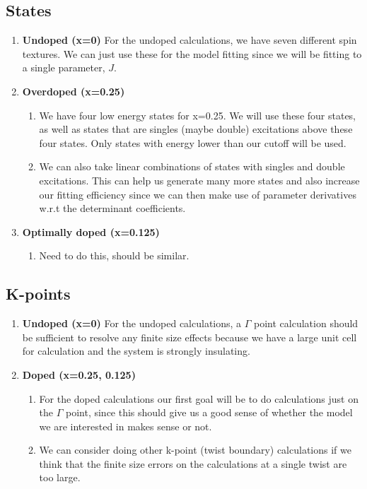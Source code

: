 \documentclass{article}
\begin{document}
\subsection{States}
\begin{enumerate}
\item \textbf{Undoped (x=0)} For the undoped calculations, we have seven different spin textures. We can just use these for the model fitting since we will be fitting to a single parameter, $J$.

\item \textbf{Overdoped (x=0.25)}
\begin{enumerate}
\item We have four low energy states for x=0.25. We will use these four states, as well as states that are singles (maybe double) excitations above these four states. Only states with energy lower than our cutoff will be used.
\item We can also take linear combinations of states with singles and double excitations. This can help us generate many more states and also increase our fitting efficiency since we can then make use of parameter derivatives w.r.t the determinant coefficients.
\end{enumerate}

\color{red}
\item \textbf{Optimally doped (x=0.125)}
\begin{enumerate}
\item Need to do this, should be similar.
\end{enumerate}
\color{blue}
\end{enumerate}

\subsection{K-points}
\begin{enumerate}
\item \textbf{Undoped (x=0)} For the undoped calculations, a $\Gamma$ point calculation should be sufficient to resolve any finite size effects because we have a large unit cell for calculation and the system is strongly insulating.

\item \textbf{Doped (x=0.25, 0.125)}
\begin{enumerate}
\item For the doped calculations our first goal will be to do calculations just on the $\Gamma$ point, since this should give us a good sense of whether the model we are interested in makes sense or not.

\item We can consider doing other k-point (twist boundary) calculations if we think that the finite size errors on the calculations at a single twist are too large.
\end{enumerate}
\end{enumerate}
\end{document}
